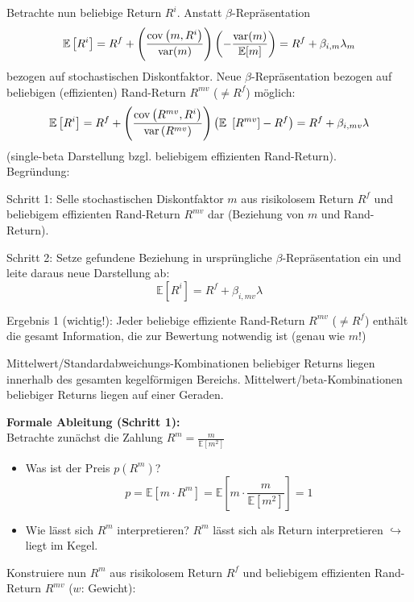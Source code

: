 \documentclass[12pt]{extreport} %
\theoremstyle{named}
\theoremstyle{nnamed}
\theoremstyle{itshape}
\theoremstyle{normal}
\begin{document}
Betrachte nun beliebige Return $R^i$. Anstatt $\beta$-Repräsentation
	$$ \mathbb{E}\left[ R^i \right] = R^f + \left( \frac{\operatorname{cov} \left( m, R^i \right)}{\operatorname{var}(m)} \right) \left( - \frac{\operatorname{var}(m)}{\mathbb{E}[m]} \right) = R^f + \beta_{i, m} \lambda_m $$
bezogen auf stochastischen Diskontfaktor. Neue $\beta$-Repräsentation bezogen auf beliebigen (effizienten) Rand-Return $R^{mv}$ ($\neq R^f$) möglich:	
	$$ \mathbb{E} \left[ R^i \right] = R^f + \left( \frac{\cov \left( R^{mv}, R^i \right)}{\var \left( R^{mv} \right)} \right) \left( \mathbb{E} \left[ R^{mv} \right] - R^f \right) = R^f + \beta_{i, mv} \lambda $$
(single-beta Darstellung bzgl. beliebigem effizienten Rand-Return). ~\\

Begründung:
\begin{description}
	\item Schritt 1: Selle stochastischen Diskontfaktor $m$ aus risikolosem Return $R^f$ und beliebigem effizienten Rand-Return $R^{mv}$ dar (Beziehung von $m$ und Rand-Return).
	\item Schritt 2: Setze gefundene Beziehung in ursprüngliche $\beta$-Repräsentation ein und leite daraus neue Darstellung ab:
		$$ \mathbb{E} \left[ R^i \right] = R^f + \beta_{i, mv} \lambda $$
\end{description}
\begin{description}
	\item Ergebnis 1 (wichtig!): Jeder beliebige effiziente Rand-Return $R^{mv}$ ($\neq R^f$) enthält die gesamt Information, die zur Bewertung notwendig ist (genau wie $m$!)
	\item Mittelwert/Standardabweichungs-Kombinationen beliebiger Returns liegen innerhalb des gesamten kegelförmigen Bereichs. Mittelwert/beta-Kombinationen beliebiger Returns liegen auf einer Geraden.
\end{description}
\newpage
\textbf{Formale Ableitung (Schritt 1):} ~\\
Betrachte zunächst die Zahlung $R^m = \frac{m}{\mathbb{E}\left[ m^2 \right]}$
\begin{itemize}
	\item Was ist der Preis $p \left( R^m \right)$?
		$$ p = \mathbb{E} \left[ m \cdot R^m \right] = \mathbb{E} \left[ m \cdot \frac{m}{\mathbb{E} \left[ m^2 \right]} \right] = 1 $$
	\item Wie lässt sich $R^m$ interpretieren? $R^m$ lässt sich als Return interpretieren $\hookrightarrow$ liegt im Kegel.
\end{itemize} 
Konstruiere nun $R^m$ aus risikolosem Return $R^f$ und beliebigem effizienten Rand-Return $R^{mv}$ ($w$: Gewicht):
\end{document}
